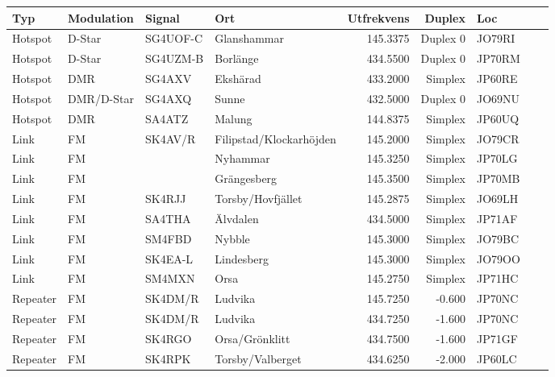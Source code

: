 \begin{longtable}{llllrrlcl}
	Typ      & Modulation & Signal   & Ort                        & Utfrekvens &   Duplex & Loc    &  &  \\ \hline
	Hotspot  & D-Star     & SG4UOF-C & Glanshammar                &   145.3375 & Duplex 0 & JO79RI &  &  \\
	Hotspot  & D-Star     & SG4UZM-B & Borlänge                   &   434.5500 & Duplex 0 & JP70RM &  &  \\
	Hotspot  & DMR        & SG4AXV   & Ekshärad                   &   433.2000 &  Simplex & JP60RE &  &  \\
	Hotspot  & DMR/D-Star & SG4AXQ   & Sunne                      &   432.5000 & Duplex 0 & JO69NU &  &  \\
	Hotspot  & DMR        & SA4ATZ   & Malung                     &   144.8375 &  Simplex & JP60UQ &  &  \\
	Link     & FM         & SK4AV/R  & Filipstad/Klockarhöjden    &   145.2000 &  Simplex & JO79CR &  &  \\
	Link     & FM         &          & Nyhammar                   &   145.3250 &  Simplex & JP70LG &  &  \\
	Link     & FM         &          & Grängesberg                &   145.3500 &  Simplex & JP70MB &  &  \\
	Link     & FM         & SK4RJJ   & Torsby/Hovfjället          &   145.2875 &  Simplex & JO69LH &  &  \\
	Link     & FM         & SA4THA   & Älvdalen                   &   434.5000 &  Simplex & JP71AF &  &  \\
	Link     & FM         & SM4FBD   & Nybble                     &   145.3000 &  Simplex & JO79BC &  &  \\
	Link     & FM         & SK4EA-L  & Lindesberg                 &   145.3000 &  Simplex & JO79OO &  &  \\
	Link     & FM         & SM4MXN   & Orsa                       &   145.2750 &  Simplex & JP71HC &  &  \\
	Repeater & FM         & SK4DM/R  & Ludvika                    &   145.7250 &   -0.600 & JP70NC &  &  \\
	Repeater & FM         & SK4DM/R  & Ludvika                    &   434.7250 &   -1.600 & JP70NC &  &  \\
	Repeater & FM         & SK4RGO   & Orsa/Grönklitt             &   434.7500 &   -1.600 & JP71GF &  &  \\
	Repeater & FM         & SK4RPK   & Torsby/Valberget           &   434.6250 &   -2.000 & JP60LC &  &  \\

\end{longtable}
